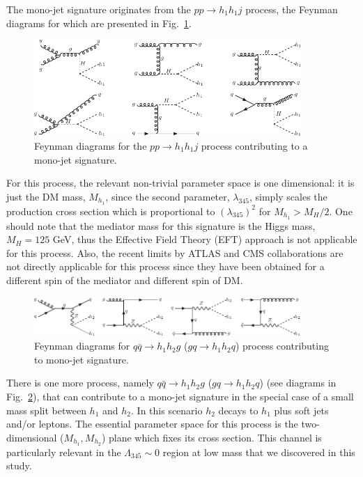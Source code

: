 \documentclass[12pt,a4paper]{article}
\newcommand {\blue} {\color{blue}}
\newcommand{\giac}[2]{{\blue #1 #2}}
\begin{document}
The mono-jet signature originates from the $pp\to h_1 h_1j$ process,
the Feynman diagrams for which are presented in Fig.~\ref{fig:fd-monojet1}.
\begin{figure}[htb!]
\begin{center}
\includegraphics[width=0.9\textwidth]{fd-mono-j1.pdf} 
\caption{Feynman diagrams for the $pp\to h_1 h_1j$ process
contributing to a mono-jet signature.}
\label{fig:fd-monojet1}
\end{center}
\end{figure}
For this process, the relevant non-trivial  parameter space is  one dimensional:
it is just the DM mass, $M_{h_1}$,  since the second parameter, $\lambda_{345}$,
simply scales the production cross section which is proportional to  $(\lambda_{345})^2$
for $M_{h_1}>M_H/2$.
One should note  that the mediator mass for this signature is the Higgs mass, $M_H = 125$ GeV, thus
the Effective Field Theory (EFT) approach is not applicable for this process. Also, the recent limits by ATLAS
\cite{Diehl:2014dda} and CMS \cite{Chatrchyan:2012me, Khachatryan:2014rra} collaborations  are not directly
applicable for this process since they have been obtained for a different spin of the mediator and different
spin of DM. 

\begin{figure}[htb!]
\begin{center}
\includegraphics[width=0.9\textwidth]{fd-mono-j2.pdf} 
\caption{Feynman diagrams for $q\bar{q}\to h_1 h_2g$ ($gq\to h_1 h_2q$) process 
contributing to mono-jet signature.}
\label{fig:fd-monojet2}
\end{center}
\end{figure}

There is one more process, namely $q\bar{q}\to
h_1 h_2g$ ($gq\to h_1 h_2q$) (see diagrams in 
Fig.~\ref{fig:fd-monojet2}),  that can contribute to a mono-jet signature in the special case of a small mass split between $h_1$ and $h_2$.
In this scenario $h_2$ decays to $h_1$ plus soft 
jets and/or leptons. 
The essential parameter space for this process is the
two-dimensional  ($M_{h_1},M_{h_2}$) plane
which fixes its cross section. This channel is particularly relevant in the $\Lambda_{345}\sim 0$ region at low mass that we discovered in this study.
\end{document}
